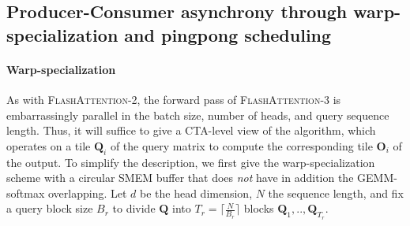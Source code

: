 \subsection{Producer-Consumer asynchrony through warp-specialization and pingpong scheduling}
\label{sec:algo_ws}

\paragraph{Warp-specialization}
As with \textsc{FlashAttention-2}, the forward pass of \textsc{FlashAttention-3} is embarrassingly parallel in the batch size, number of heads, and query sequence length. Thus, it will suffice to give a CTA-level view of the algorithm, which operates on a tile $\mathbf{Q}_i$ of the query matrix to compute the corresponding tile $\mathbf{O}_i$ of the output. To simplify the description, we first give the warp-specialization scheme with a circular SMEM buffer that does \emph{not} have in addition the GEMM-softmax overlapping. Let $d$ be the head dimension, $N$ the sequence length, and fix a query block size $B_r$ to divide $\mathbf{Q}$ into $T_r = \lceil \frac{N}{B_r} \rceil$ blocks $\mathbf{Q}_1, .., \mathbf{Q}_{T_r}$.

